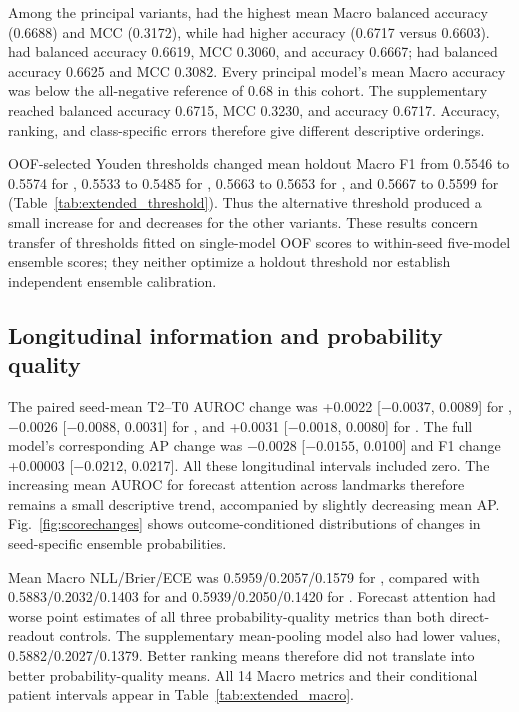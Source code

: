 Among the principal variants, \fullmodel{} had the highest mean Macro balanced accuracy (0.6688) and MCC (0.3172), while \direct{} had higher accuracy (0.6717 versus 0.6603). \nojepa{} had balanced accuracy 0.6619, MCC 0.3060, and accuracy 0.6667; \direct{} had balanced accuracy 0.6625 and MCC 0.3082. Every principal model's mean Macro accuracy was below the all-negative reference of 0.68 in this cohort. The supplementary \meanmodel{} reached balanced accuracy 0.6715, MCC 0.3230, and accuracy 0.6717. Accuracy, ranking, and class-specific errors therefore give different descriptive orderings.

OOF-selected Youden thresholds changed mean holdout Macro F1 from 0.5546 to 0.5574 for \nojepa{}, 0.5533 to 0.5485 for \direct{}, 0.5663 to 0.5653 for \fullmodel{}, and 0.5667 to 0.5599 for \meanmodel{} (Table~\ref{tab:extended_threshold}). Thus the alternative threshold produced a small increase for \nojepa{} and decreases for the other variants. These results concern transfer of thresholds fitted on single-model OOF scores to within-seed five-model ensemble scores; they neither optimize a holdout threshold nor establish independent ensemble calibration.

\subsection{Longitudinal information and probability quality}
The paired seed-mean T2--T0 AUROC change was +0.0022 [$-0.0037$, 0.0089] for \fullmodel{}, $-0.0026$ [$-0.0088$, 0.0031] for \nojepa{}, and +0.0031 [$-0.0018$, 0.0080] for \direct{}. The full model's corresponding AP change was $-0.0028$ [$-0.0155$, 0.0100] and F1 change +0.00003 [$-0.0212$, 0.0217]. All these longitudinal intervals included zero. The increasing mean AUROC for forecast attention across landmarks therefore remains a small descriptive trend, accompanied by slightly decreasing mean AP. Fig.~\ref{fig:scorechanges} shows outcome-conditioned distributions of changes in seed-specific ensemble probabilities.


Mean Macro NLL/Brier/ECE was 0.5959/0.2057/0.1579 for \fullmodel{}, compared with 0.5883/0.2032/0.1403 for \direct{} and 0.5939/0.2050/0.1420 for \nojepa{}. Forecast attention had worse point estimates of all three probability-quality metrics than both direct-readout controls. The supplementary mean-pooling model also had lower values, 0.5882/0.2027/0.1379. Better ranking means therefore did not translate into better probability-quality means. All 14 Macro metrics and their conditional patient intervals appear in Table~\ref{tab:extended_macro}.

